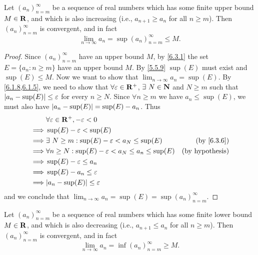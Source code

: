 \begin{proposition}\label{6.3.8}
  Let \((a_n)_{n = m}^\infty\) be a sequence of real numbers which has some finite upper bound \(M \in \mathbf{R}\), and which is also increasing (i.e., \(a_{n + 1} \geq a_n\) for all \(n \geq m\)).
  Then \((a_n)_{n = m}^\infty\) is convergent, and in fact
  \[
    \lim_{n \to \infty} a_n = \sup(a_n)_{n = m}^\infty \leq M.
  \]
\end{proposition}

\begin{proof}
  Since \((a_n)_{n = m}^\infty\) have an upper bound \(M\), by \cref{6.3.1} the set \(E = \{a_n : n \geq m\}\) have an upper bound \(M\).
  By \cref{5.5.9} \(\sup(E)\) must exist and \(\sup(E) \leq M\).
  Now we want to show that \(\lim_{n \to \infty} a_n = \sup(E)\).
  By \cref{6.1.8,6.1.5}, we need to show that \(\forall \varepsilon \in \mathbf{R}^+\), \(\exists\ N \in \mathbf{N}\) and \(N \geq m\) such that \(\left\lvert a_n - \sup(E)\right\rvert \leq \varepsilon\) for every \(n \geq N\).
  Since \(\forall n \geq m\) we have \(a_n \leq \sup(E)\), we must also have \(\left\lvert a_n - \sup(E)\right\rvert = \sup(E) - a_n\).
  Thus
  \begin{align*}
             & \forall \varepsilon \in \R^+, -\varepsilon < 0                                                  \\
    \implies & \sup(E) - \varepsilon < \sup(E)                                                                 \\
    \implies & \exists\ N \geq m : \sup(E) - \varepsilon < a_N \leq \sup(E)         & \text{(by \cref{6.3.6})} \\
    \implies & \forall n \geq N : \sup(E) - \varepsilon < a_N \leq a_n \leq \sup(E) & \text{(by hypothesis)}   \\
    \implies & \sup(E) - \varepsilon \leq a_n                                                                  \\
    \implies & \sup(E) - a_n \leq \varepsilon                                                                  \\
    \implies & \abs{a_n - \sup(E)} \leq \varepsilon
  \end{align*}
  and we conclude that \(\lim_{n \to \infty} a_n = \sup(E) = \sup(a_n)_{n = m}^\infty\).
\end{proof}

\begin{additional corollary}\label{ac 6.3.1}
Let \((a_n)_{n = m}^\infty\) be a sequence of real numbers which has some finite lower bound \(M \in \mathbf{R}\), and which is also decreasing (i.e., \(a_{n + 1} \leq a_n\) for all \(n \geq m\)).
Then \((a_n)_{n = m}^\infty\) is convergent, and in fact
\[
  \lim_{n \to \infty} a_n = \inf(a_n)_{n = m}^\infty \geq M.
\]
\end{additional corollary}

